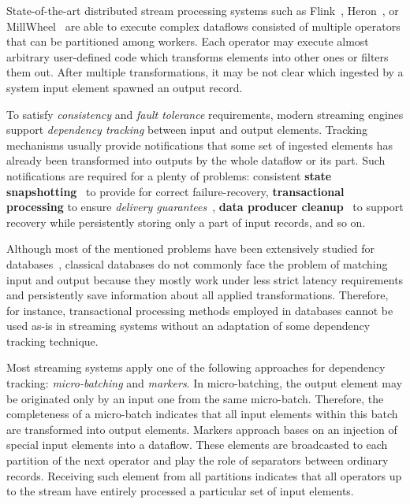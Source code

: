 \label {fs-acker-intro}

State-of-the-art distributed stream processing systems such as Flink~\cite{Carbone:2017:SMA:3137765.3137777}, Heron~\cite{Kulkarni:2015:THS:2723372.2742788}, or MillWheel~\cite{Akidau:2013:MFS:2536222.2536229} are able to execute complex dataflows consisted of multiple operators that can be partitioned among workers. Each operator may execute almost arbitrary user-defined code which transforms elements into other ones or filters them out. After multiple transformations, it may be not clear which ingested by a system input element spawned an output record. 

To satisfy {\em consistency} and {\em fault tolerance} requirements, modern streaming engines support {\em dependency tracking} between input and output elements. Tracking mechanisms usually provide notifications that some set of ingested elements has already been transformed into outputs by the whole dataflow or its part. Such notifications are required for a plenty of problems: consistent {\bf state snapshotting}~\cite{Akidau:2013:MFS:2536222.2536229, 2015arXiv150608603C} to provide for correct failure-recovery, {\bf transactional processing} to ensure {\em delivery guarantees}~\cite{thepaper, Carbone:2017:SMA:3137765.3137777}, {\bf data producer cleanup}~\cite{Noghabi:2017:SSS:3137765.3137770} to support recovery while persistently storing only a part of input records, and so on. 

Although most of the mentioned problems have been extensively studied for databases~\cite{DBLP:books/mk/WeikumV2002}, classical databases do not commonly face the problem of matching input and output because they mostly work under less strict latency requirements and persistently save information about all applied transformations. Therefore, for instance, transactional processing methods employed in databases cannot be used as-is in streaming systems without an adaptation of some dependency tracking technique.

Most streaming systems apply one of the following approaches for dependency tracking: {\em micro-batching} and {\em markers}. In micro-batching, the output element may be originated only by an input one from the same micro-batch. Therefore, the completeness of a micro-batch indicates that all input elements within this batch are transformed into output elements. Markers approach bases on an injection of special input elements into a dataflow. These elements are broadcasted to each partition of the next operator and play the role of separators between ordinary records. Receiving such element from all partitions indicates that all operators up to the stream have entirely processed a particular set of input elements. 

